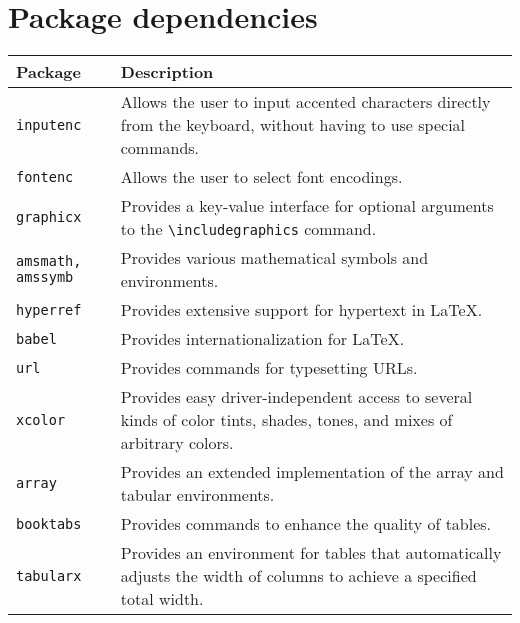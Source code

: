 \section{Package dependencies}

\noindent\begin{tabularx}{\linewidth}{|X|X|}
    \hline
    \textbf{Package}        & \textbf{Description}                                                                                                   \\
    \hline
    \verb|inputenc|         & Allows the user to input accented characters directly from the keyboard, without having to use special commands.       \\
    \hline
    \verb|fontenc|          & Allows the user to select font encodings.                                                                              \\
    \hline
    \verb|graphicx|         & Provides a key-value interface for optional arguments to the \verb|\includegraphics| command.                          \\
    \hline
    \verb|amsmath, amssymb| & Provides various mathematical symbols and environments.                                                                \\
    \hline
    \verb|hyperref|         & Provides extensive support for hypertext in LaTeX.                                                                     \\
    \hline
    \verb|babel|            & Provides internationalization for LaTeX.                                                                               \\
    \hline
    \verb|url|              & Provides commands for typesetting URLs.                                                                                \\
    \hline
    \verb|xcolor|           & Provides easy driver-independent access to several kinds of color tints, shades, tones, and mixes of arbitrary colors. \\
    \hline
    \verb|array|            & Provides an extended implementation of the array and tabular environments.                                             \\
    \hline
    \verb|booktabs|         & Provides commands to enhance the quality of tables.                                                                    \\
    \hline
    \verb|tabularx|         & Provides an environment for tables that automatically adjusts the width of columns to achieve a specified total width. \\

\end{tabularx}
